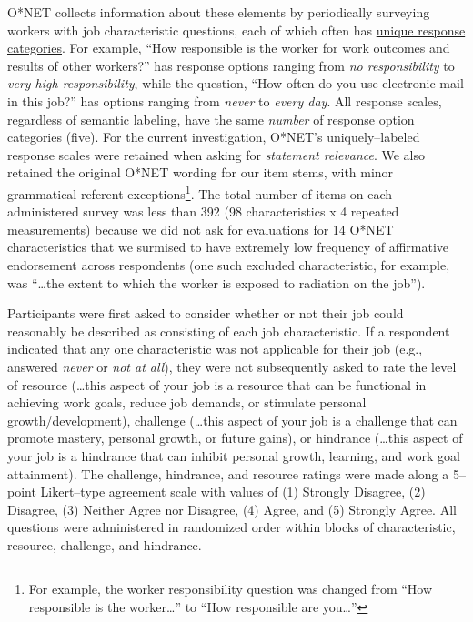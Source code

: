 \documentclass[
  man]{apa7}
\begin{document}
O*NET collects information about these elements by periodically surveying workers with job characteristic questions, each of which often has \href{https://www.ONETonline.org/find/descriptor/result/4.C.1.c.2}{unique response categories}. For example, ``How responsible is the worker for work outcomes and results of other workers?'' has response options ranging from \emph{no responsibility} to \emph{very high responsibility}, while the question, ``How often do you use electronic mail in this job?'' has options ranging from \emph{never} to \emph{every day}. All response scales, regardless of semantic labeling, have the same \emph{number} of response option categories (five). For the current investigation, O*NET's uniquely--labeled response scales were retained when asking for \emph{statement relevance}. We also retained the original O*NET wording for our item stems, with minor grammatical referent exceptions\footnote{For example, the worker responsibility question was changed from ``How responsible is the worker\ldots{}'' to ``How responsible are you\ldots{}''}. The total number of items on each administered survey was less than 392 (98 characteristics x 4 repeated measurements) because we did not ask for evaluations for 14 O*NET characteristics that we surmised to have extremely low frequency of affirmative endorsement across respondents (one such excluded characteristic, for example, was ``\ldots the extent to which the worker is exposed to radiation on the job'').

Participants were first asked to consider whether or not their job could reasonably be described as consisting of each job characteristic. If a respondent indicated that any one characteristic was not applicable for their job (e.g., answered \emph{never} or \emph{not at all}), they were not subsequently asked to rate the level of resource (\ldots this aspect of your job is a resource that can be functional in achieving work goals, reduce job demands, or stimulate personal growth/development), challenge (\ldots this aspect of your job is a challenge that can promote mastery, personal growth, or future gains), or hindrance (\ldots this aspect of your job is a hindrance that can inhibit personal growth, learning, and work goal attainment). The challenge, hindrance, and resource ratings were made along a 5--point Likert--type agreement scale with values of (1) Strongly Disagree, (2) Disagree, (3) Neither Agree nor Disagree, (4) Agree, and (5) Strongly Agree. All questions were administered in randomized order within blocks of characteristic, resource, challenge, and hindrance.
\end{document}
